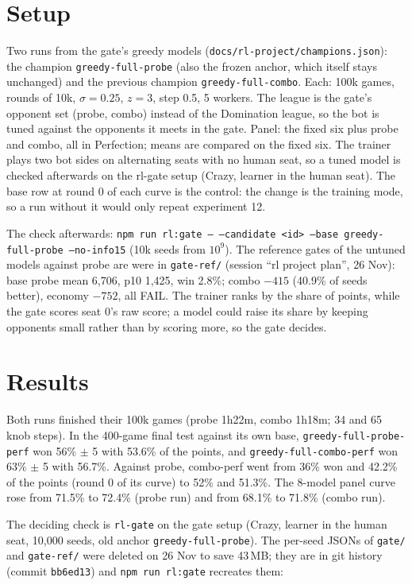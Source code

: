 \documentclass{../polyexp}
\begin{document}
\section{Setup}
Two runs from the gate's greedy models (\texttt{docs/rl-project/champions.json}): the champion
\texttt{greedy-full-probe} (also the frozen anchor, which itself stays unchanged) and the previous
champion \texttt{greedy-full-combo}. Each: 100k games, rounds of 10k, $\sigma = 0.25$, $z = 3$,
step 0.5, 5 workers. The league is the gate's opponent set (probe, combo) instead of the
Domination league, so the bot is tuned against the opponents it meets in the gate. Panel: the
fixed six plus probe and combo, all in Perfection; means are compared on the fixed six. The
trainer plays two bot sides on alternating seats with no human seat, so a tuned model is checked
afterwards on the rl-gate setup (Crazy, learner in the human seat). The base row at round 0 of each
curve is the control: the change is the training mode, so a run without it would only repeat
experiment 12.

The check afterwards: \texttt{npm run rl:gate -- --candidate <id> --base greedy-full-probe
--no-info15} (10k seeds from $10^9$). The reference gates of the untuned models against probe are
were in \texttt{gate-ref/} (session ``rl project plan'', 26 Nov): base probe mean 6,706, p10 1,425,
win 2.8\%; combo $-415$ (40.9\% of seeds better), economy $-752$, all FAIL. The trainer ranks by the
share of points, while the gate scores seat 0's raw score; a model could raise its share by keeping
opponents small rather than by scoring more, so the gate decides.

\section{Results}
\ExpResults

Both runs finished their 100k games (probe 1h22m, combo 1h18m; 34 and 65 knob steps). In the
400-game final test against its own base, \texttt{greedy-full-probe-perf} won 56\% $\pm$ 5 with 53.6\%
of the points, and \texttt{greedy-full-combo-perf} won 63\% $\pm$ 5 with 56.7\%. Against probe, combo-perf
went from 36\% won and 42.2\% of the points (round 0 of its curve) to 52\% and 51.3\%. The 8-model panel
curve rose from 71.5\% to 72.4\% (probe run) and from 68.1\% to 71.8\% (combo run).

The deciding check is \texttt{rl-gate} on the gate setup (Crazy, learner in the human seat, 10{,}000
seeds, old anchor \texttt{greedy-full-probe}). The per-seed JSONs of \texttt{gate/} and \texttt{gate-ref/} were deleted on
26 Nov to save 43\,MB; they are in git history (commit \texttt{bb6ed13}) and \texttt{npm run rl:gate} recreates them:
\end{document}
